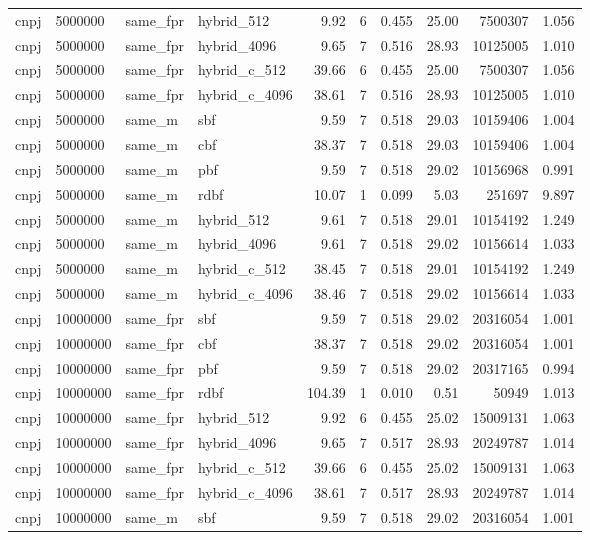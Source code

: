 \begin{tabular}{llllrrrrrr}
cnpj & 5000000 & same\_fpr & hybrid\_512 & 9.92 & 6 & 0.455 & 25.00 & 7500307 & 1.056 \\
cnpj & 5000000 & same\_fpr & hybrid\_4096 & 9.65 & 7 & 0.516 & 28.93 & 10125005 & 1.010 \\
cnpj & 5000000 & same\_fpr & hybrid\_c\_512 & 39.66 & 6 & 0.455 & 25.00 & 7500307 & 1.056 \\
cnpj & 5000000 & same\_fpr & hybrid\_c\_4096 & 38.61 & 7 & 0.516 & 28.93 & 10125005 & 1.010 \\
cnpj & 5000000 & same\_m & sbf & 9.59 & 7 & 0.518 & 29.03 & 10159406 & 1.004 \\
cnpj & 5000000 & same\_m & cbf & 38.37 & 7 & 0.518 & 29.03 & 10159406 & 1.004 \\
cnpj & 5000000 & same\_m & pbf & 9.59 & 7 & 0.518 & 29.02 & 10156968 & 0.991 \\
cnpj & 5000000 & same\_m & rdbf & 10.07 & 1 & 0.099 & 5.03 & 251697 & 9.897 \\
cnpj & 5000000 & same\_m & hybrid\_512 & 9.61 & 7 & 0.518 & 29.01 & 10154192 & 1.249 \\
cnpj & 5000000 & same\_m & hybrid\_4096 & 9.61 & 7 & 0.518 & 29.02 & 10156614 & 1.033 \\
cnpj & 5000000 & same\_m & hybrid\_c\_512 & 38.45 & 7 & 0.518 & 29.01 & 10154192 & 1.249 \\
cnpj & 5000000 & same\_m & hybrid\_c\_4096 & 38.46 & 7 & 0.518 & 29.02 & 10156614 & 1.033 \\
cnpj & 10000000 & same\_fpr & sbf & 9.59 & 7 & 0.518 & 29.02 & 20316054 & 1.001 \\
cnpj & 10000000 & same\_fpr & cbf & 38.37 & 7 & 0.518 & 29.02 & 20316054 & 1.001 \\
cnpj & 10000000 & same\_fpr & pbf & 9.59 & 7 & 0.518 & 29.02 & 20317165 & 0.994 \\
cnpj & 10000000 & same\_fpr & rdbf & 104.39 & 1 & 0.010 & 0.51 & 50949 & 1.013 \\
cnpj & 10000000 & same\_fpr & hybrid\_512 & 9.92 & 6 & 0.455 & 25.02 & 15009131 & 1.063 \\
cnpj & 10000000 & same\_fpr & hybrid\_4096 & 9.65 & 7 & 0.517 & 28.93 & 20249787 & 1.014 \\
cnpj & 10000000 & same\_fpr & hybrid\_c\_512 & 39.66 & 6 & 0.455 & 25.02 & 15009131 & 1.063 \\
cnpj & 10000000 & same\_fpr & hybrid\_c\_4096 & 38.61 & 7 & 0.517 & 28.93 & 20249787 & 1.014 \\
cnpj & 10000000 & same\_m & sbf & 9.59 & 7 & 0.518 & 29.02 & 20316054 & 1.001 \\

\end{tabular}
